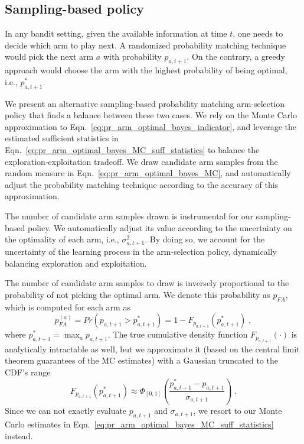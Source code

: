 \documentclass{article}
\newcommand{\ie}{i.e., }
\begin{document}
\subsection{Sampling-based policy}
\label{ssec:sampling_policy}

In any bandit setting, given the available information at time $t$, one needs to decide which arm to play next. A randomized probability matching technique would pick the next arm $a$ with probability $p_{a,t+1}$. On the contrary, a greedy approach would choose the arm with the highest probability of being optimal, \ie $p^*_{a,t+1}$.

We present an alternative sampling-based probability matching arm-selection policy that finds a balance between these two cases. We rely on the Monte Carlo approximation to Eqn.~\eqref{eq:pr_arm_optimal_bayes_indicator}, and leverage the estimated sufficient statistics in Eqn.~\eqref{eq:pr_arm_optimal_bayes_MC_suff_statistics} to balance the exploration-exploitation tradeoff. We draw candidate arm samples from the random measure in Eqn.~\eqref{eq:pr_arm_optimal_bayes_MC}, and automatically adjust the probability matching technique according to the accuracy of this approximation.

The number of candidate arm samples drawn is instrumental for our sampling-based policy. We automatically adjust its value according to the uncertainty on the optimality of each arm, \ie $\sigma^2_{a,t+1}$. By doing so, we account for the uncertainty of the learning process in the arm-selection policy, dynamically balancing exploration and exploitation.

The number of candidate arm samples to draw is inversely proportional to the probability of not picking the optimal arm. We denote this probability as $p_{FA}$, which is computed for each arm as
\begin{equation}
p_{FA}^{(a)} =Pr\left(p_{a,t+1} > p^*_{a,t+1} \right) = 1 - F_{p_{a,t+1}}(p^*_{a,{t+1}}) \; ,
\end{equation}
where $p_{a,t+1}^*=\max_{a}p_{a,t+1}$. The true cumulative density function $F_{p_{a,t+1}}(\cdot)$ is analytically intractable as well, but we approximate it (based on the central limit theorem guarantees of the MC estimates) with a Gaussian truncated to the CDF's range
\begin{equation}
F_{p_{a,t+1}}(p^*_{a,{t+1}}) \approx \Phi_{[0,1]}\left(\frac{p^*_{a,{t+1}}-p_{a,t+1}}{\sigma_{a,t+1}}\right) \;.
\end{equation}
Since we can not exactly evaluate $p_{a,t+1}$ and $\sigma_{a,t+1}$, we resort to our Monte Carlo estimates in Eqn.~\eqref{eq:pr_arm_optimal_bayes_MC_suff_statistics} instead. 
\end{document}
